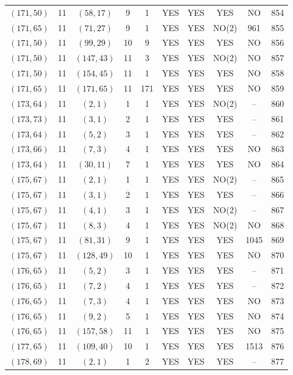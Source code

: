 \begin{longtable}{|c|c|c|c|c|c|c|c|c|c|}
$(171, 50)$ & 11 & $(58, 17)$ & 9 & 1 & YES & YES & YES & NO & 854\\
$(171, 65)$ & 11 & $(71, 27)$ & 9 & 1 & YES & YES & NO(2) & 961 & 855\\
$(171, 50)$ & 11 & $(99, 29)$ & 10 & 9 & YES & YES & YES & NO & 856\\
$(171, 50)$ & 11 & $(147, 43)$ & 11 & 3 & YES & YES & NO(2) & NO & 857\\
$(171, 50)$ & 11 & $(154, 45)$ & 11 & 1 & YES & YES & YES & NO & 858\\
$(171, 65)$ & 11 & $(171, 65)$ & 11 & 171 & YES & YES & YES & NO & 859\\
$(173, 64)$ & 11 & $(2, 1)$ & 1 & 1 & YES & YES & NO(2) & -- & 860\\
$(173, 73)$ & 11 & $(3, 1)$ & 2 & 1 & YES & YES & YES & -- & 861\\
$(173, 64)$ & 11 & $(5, 2)$ & 3 & 1 & YES & YES & YES & -- & 862\\
$(173, 66)$ & 11 & $(7, 3)$ & 4 & 1 & YES & YES & YES & NO & 863\\
$(173, 64)$ & 11 & $(30, 11)$ & 7 & 1 & YES & YES & YES & NO & 864\\
$(175, 67)$ & 11 & $(2, 1)$ & 1 & 1 & YES & YES & NO(2) & -- & 865\\
$(175, 67)$ & 11 & $(3, 1)$ & 2 & 1 & YES & YES & YES & -- & 866\\
$(175, 67)$ & 11 & $(4, 1)$ & 3 & 1 & YES & YES & NO(2) & -- & 867\\
$(175, 67)$ & 11 & $(8, 3)$ & 4 & 1 & YES & YES & NO(2) & NO & 868\\
$(175, 67)$ & 11 & $(81, 31)$ & 9 & 1 & YES & YES & YES & 1045 & 869\\
$(175, 67)$ & 11 & $(128, 49)$ & 10 & 1 & YES & YES & YES & NO & 870\\
$(176, 65)$ & 11 & $(5, 2)$ & 3 & 1 & YES & YES & YES & -- & 871\\
$(176, 65)$ & 11 & $(7, 2)$ & 4 & 1 & YES & YES & YES & -- & 872\\
$(176, 65)$ & 11 & $(7, 3)$ & 4 & 1 & YES & YES & YES & NO & 873\\
$(176, 65)$ & 11 & $(9, 2)$ & 5 & 1 & YES & YES & YES & NO & 874\\
$(176, 65)$ & 11 & $(157, 58)$ & 11 & 1 & YES & YES & YES & NO & 875\\
$(177, 65)$ & 11 & $(109, 40)$ & 10 & 1 & YES & YES & YES & 1513 & 876\\
$(178, 69)$ & 11 & $(2, 1)$ & 1 & 2 & YES & YES & YES & -- & 877\\

\end{longtable}
